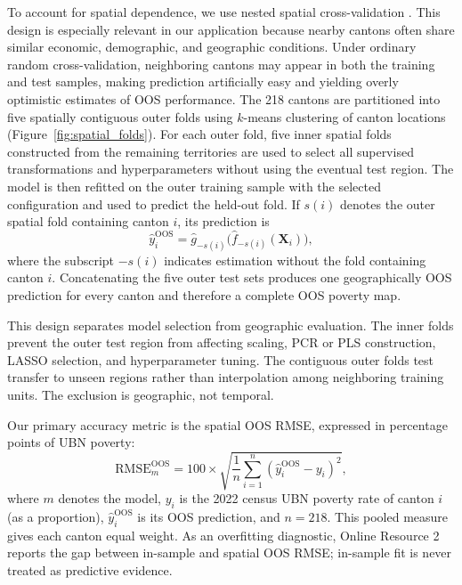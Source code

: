 \documentclass[pdflatex,sn-apa]{sn-jnl}
\begin{document}
To account for spatial dependence, we use nested spatial cross-validation \citep{Mahoney2023}. This design is especially relevant in our application because nearby cantons often share similar economic, demographic, and geographic conditions. Under ordinary random cross-validation, neighboring cantons may appear in both the training and test samples, making prediction artificially easy and yielding overly optimistic estimates of OOS performance. The 218 cantons are partitioned into five spatially contiguous outer folds using $k$-means clustering of canton locations (Figure~\ref{fig:spatial_folds}). For each outer fold, five inner spatial folds constructed from the remaining territories are used to select all supervised transformations and hyperparameters without using the eventual test region. The model is then refitted on the outer training sample with the selected configuration and used to predict the held-out fold. If $s(i)$ denotes the outer spatial fold containing canton $i$, its prediction is
\begin{equation}
\hat{y}^{\mathrm{OOS}}_i=\hat{g}_{-s(i)}\big(\hat{f}_{-s(i)}(\mathbf{X}_i)\big),
\label{eq:oos_prediction}
\end{equation}
where the subscript $-s(i)$ indicates estimation without the fold containing canton $i$. Concatenating the five outer test sets produces one geographically OOS prediction for every canton and therefore a complete OOS poverty map.

This design separates model selection from geographic evaluation. The inner folds prevent the outer test region from affecting scaling, PCR or PLS construction, LASSO selection, and hyperparameter tuning. The contiguous outer folds test transfer to unseen regions rather than interpolation among neighboring training units. The exclusion is geographic, not temporal.

Our primary accuracy metric is the spatial OOS RMSE, expressed in percentage points of UBN poverty:
\begin{equation}
\text{RMSE}^{\text{OOS}}_{m}
=
100\times\sqrt{\frac{1}{n} \sum_{i=1}^{n} \left( \hat{y}^{\text{OOS}}_{i}-y_{i} \right)^2},
\label{eq:rmse}
\end{equation}
where $m$ denotes the model, $y_{i}$ is the 2022 census UBN poverty rate of canton $i$ (as a proportion), $\hat{y}^{\text{OOS}}_{i}$ is its OOS prediction, and $n=218$. This pooled measure gives each canton equal weight. As an overfitting diagnostic, Online Resource 2 reports the gap between in-sample and spatial OOS RMSE; in-sample fit is never treated as predictive evidence.
\end{document}
